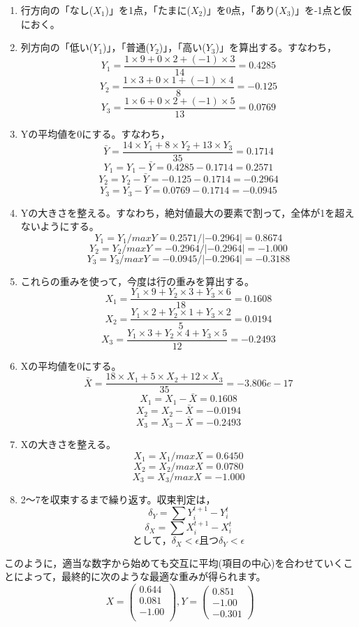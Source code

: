 \documentclass{ltjsbook}
\begin{document}
\begin{enumerate}
	\item 行方向の「なし($X_{1}$)」を1点，「たまに($X_{2}$)」を0点，「あり($X_{3}$)」を-1点と仮におく。
	\item 列方向の「低い($Y_{1}$)」，「普通($Y_{2}$)」，「高い($Y_{3}$)」を算出する。すなわち，
	      $$Y_{1}=\frac{1 \times 9 + 0 \times 2 + (-1) \times 3 }{14} = 0.4285$$
	      $$Y_{2}=\frac{1 \times 3 + 0 \times 1 + (-1) \times 4 }{8} = -0.125$$
	      $$Y_{3}=\frac{1 \times 6 + 0 \times 2 + (-1) \times 5 }{13} = 0.0769$$
	\item Yの平均値を0にする。すなわち，
	      $$ \bar{Y} = \frac{14 \times Y_{1} + 8 \times Y_{2} + 13 \times Y_{3}}{35}=0.1714$$
	      $$Y_{1} = Y_{1} - \bar{Y} = 0.4285 - 0.1714 = 0.2571$$
	      $$Y_{2} = Y_{2} - \bar{Y} = -0.125 - 0.1714 = -0.2964$$
	      $$Y_{3} = Y_{3} - \bar{Y} = 0.0769 - 0.1714 = -0.0945$$
	\item Yの大きさを整える。すなわち，絶対値最大の要素で割って，全体が1を超えないようにする。
	      $$Y_{1} = Y_{1} / maxY = 0.2571 / |-0.2964| = 0.8674 $$
	      $$Y_{2} = Y_{2} / maxY = -0.2964 / |-0.2964| = -1.000 $$
	      $$Y_{3} = Y_{3} / maxY = -0.0945 / |-0.2964| = -0.3188 $$
	\item これらの重みを使って，今度は行の重みを算出する。
	      $$X_{1}=\frac{Y_{1} \times 9 + Y_{2} \times 3 + Y_{3} \times 6 }{18} = 0.1608$$
	      $$X_{2}=\frac{Y_{1} \times 2 + Y_{2} \times 1 + Y_{3} \times 2 }{5} = 0.0194$$
	      $$X_{3}=\frac{Y_{1} \times 3 + Y_{2} \times 4 + Y_{3} \times 5 }{12} = -0.2493$$
	\item Xの平均値を0にする。
	      $$ \bar{X} = \frac{18 \times X_{1} + 5 \times X_{2} + 12 \times X_{3}}{35}=-3.806e-17$$
	      $$X_{1} = X_{1} - \bar{X} = 0.1608$$
	      $$X_{2} = X_{2} - \bar{X} = -0.0194$$
	      $$X_{3} = X_{3} - \bar{X} = -0.2493$$
	\item Xの大きさを整える。
	      $$X_{1} = X_{1} / maxX = 0.6450 $$
	      $$X_{2} = X_{2} / maxX = 0.0780 $$
	      $$X_{3} = X_{3} / maxX = -1.000 $$
	\item 2〜7を収束するまで繰り返す。収束判定は，
	      $$ \delta_{Y} = \sum Y_{i}^{t+1} - Y_{i}^{t} $$
	      $$ \delta_{X} = \sum X_{i}^{t+1} - X_{i}^{t} $$
	      $$ として，\delta_{X} < \epsilon　且つ　\delta_{Y} < \epsilon $$
\end{enumerate}

このように，適当な数字から始めても交互に平均(項目の中心)を合わせていくことによって，最終的に次のような最適な重みが得られます。
\[
	X=
	\left(
	\begin{array}{c}
			0.644 \\
			0.081 \\
			-1.00 \\
		\end{array}
	\right)
	,Y=
	\left(
	\begin{array}{c}
			0.851 \\
			-1.00 \\
			-0.301
		\end{array}
	\right)
\]
\end{document}

